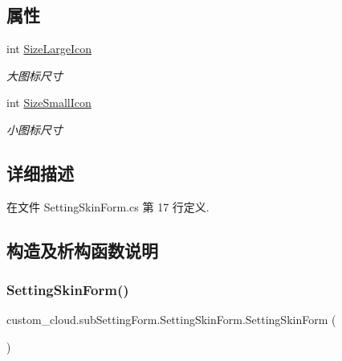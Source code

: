 \subsection*{属性}
\begin{DoxyCompactItemize}
\item 
int \hyperlink{classcustom__cloud_1_1sub_setting_form_1_1_setting_skin_form_a3f119ebc84d9f6d4a294c0a8f6a4e869}{Size\+Large\+Icon}
\begin{DoxyCompactList}\small\item\em 大图标尺寸 \end{DoxyCompactList}\item 
int \hyperlink{classcustom__cloud_1_1sub_setting_form_1_1_setting_skin_form_a0da4ae4b299bf6633a12a963e73efd68}{Size\+Small\+Icon}
\begin{DoxyCompactList}\small\item\em 小图标尺寸 \end{DoxyCompactList}\end{DoxyCompactItemize}


\subsection{详细描述}


在文件 Setting\+Skin\+Form.\+cs 第 17 行定义.



\subsection{构造及析构函数说明}
\mbox{\label{classcustom__cloud_1_1sub_setting_form_1_1_setting_skin_form_aaa1f418aac7f563d866920c1b854cdd1}} 
\subsubsection{\texorpdfstring{Setting\+Skin\+Form()}{SettingSkinForm()}}
{\footnotesize\ttfamily custom\+\_\+cloud.\+sub\+Setting\+Form.\+Setting\+Skin\+Form.\+Setting\+Skin\+Form (\begin{DoxyParamCaption}{ }\end{DoxyParamCaption})}



